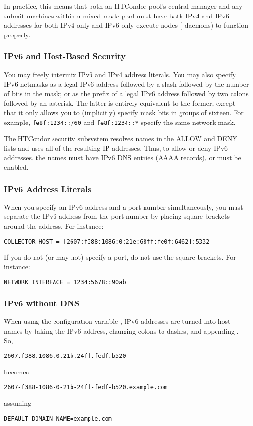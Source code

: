 In practice, this means that both an HTCondor pool's central manager
and any submit machines within a mixed mode pool must have both IPv4 and IPv6
addresses for both IPv4-only and IPv6-only execute nodes 
( daemons) to function properly.

\subsubsection{IPv6 and Host-Based Security}

You may freely intermix IPv6 and IPv4 address literals.  You may also specify
IPv6 netmasks as a legal IPv6 address followed by a slash followed by the
number of bits in the mask; or as the prefix of a legal IPv6 address followed
by two colons followed by an asterisk.  The latter is entirely equivalent to the
former, except that it only allows you to (implicitly) specify mask bits
in groups of sixteen.  For example, \texttt{fe8f:1234::/60} and
\texttt{fe8f:1234::*} specify the same network mask.

The HTCondor security subsystem resolves names in the ALLOW and DENY
lists and uses all of the resulting IP addresses.  Thus, to allow or deny
IPv6 addresses, the names must have IPv6 DNS entries (AAAA records), or
 must be enabled.

\subsubsection{IPv6 Address Literals}

When you specify an IPv6 address and a port number simultaneously, you
must separate the IPv6 address from the port number by placing square
brackets around the address.  For instance:

\begin{verbatim}
COLLECTOR_HOST = [2607:f388:1086:0:21e:68ff:fe0f:6462]:5332
\end{verbatim}

If you do not (or may not) specify a port, do not use the square brackets.
For instance:

\begin{verbatim}
NETWORK_INTERFACE = 1234:5678::90ab
\end{verbatim}

\subsubsection{IPv6 without DNS}

When using the configuration variable ,
IPv6 addresses are turned into host names by taking the IPv6 address,
changing colons to dashes, and appending .
So,
\begin{verbatim}
2607:f388:1086:0:21b:24ff:fedf:b520
\end{verbatim}
becomes
\begin{verbatim}
2607-f388-1086-0-21b-24ff-fedf-b520.example.com
\end{verbatim}
assuming
\begin{verbatim}
DEFAULT_DOMAIN_NAME=example.com
\end{verbatim}

